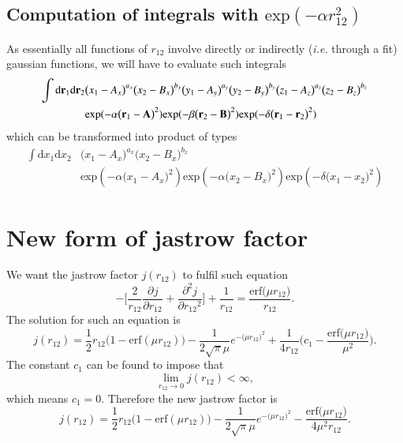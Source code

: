 \documentclass[aip,jcp,reprint,noshowkeys,superscriptaddress]{revtex4-1}
\newcommand{\deriv}[3]{\frac{\partial^{#3} #1}{\partial {#2}^{#3}}}
\newcommand{\br}[0]{{\bf {r}}}
\begin{document}
\subsection{Computation of integrals with $\text{exp}(-\alpha r_{12}^2)$}
As essentially all functions of $r_{12}$ involve directly or indirectly (\textit{i.e.} through a fit) gaussian functions, we will have to evaluate such integrals
\begin{equation}
 \begin{aligned}
  \int \text{d}\br{}_1  \text{d}\br{}_2& \big( x_1 - A_x \big)^{a_x}  \big( x_2 - B_x \big)^{b_x} 
                                         \big( y_1 - A_y \big)^{a_y}  \big( y_2 - B_y \big)^{b_y} 
                                         \big( z_1 - A_z \big)^{a_z}  \big( z_2 - B_z \big)^{b_z} \\
                                       & \text{exp}(-\alpha \big(\br{}_1 - {\bf A} \big)^2)
                                         \text{exp}(-\beta  \big(\br{}_2 - {\bf B} \big)^2)
                                         \text{exp}(-\delta \big(\br{}_1 - \br{}_2 \big)^2)
 \end{aligned}
\end{equation}
which can be transformed into product of types 
\begin{equation}
 \begin{aligned}
  \int \text{d}x_1 \text{d}x_2 & \big( x_1 - A_x \big)^{a_x} \big( x_2 - B_x \big)^{b_x} \\ 
  & \text{exp}(-\alpha \big(x_1 - A_x \big)^2) \text{exp}(-\alpha \big(x_2 - B_x \big)^2) \text{exp}(-\delta \big(x_1 - x_2 \big)^2)
 \end{aligned}
\end{equation}

\section{New form of jastrow factor}
We want the jastrow factor $j(r_{12})$ to fulfil such equation
\begin{equation}
 - \bigg[ \frac{2}{r_{12}} \deriv{j}{r_{12}}{}  + \deriv{j}{r_{12}}{2} \bigg] + \frac{1}{r_{12}} = \frac{\text{erf}\big( \mu r_{12} \big)}{r_{12}}.
\end{equation}
The solution for such an equation is 
\begin{equation}
 j(r_{12}) = \frac{1}{2}r_{12}\bigg( 1 - \text{erf}(\mu r_{12}) \bigg) - \frac{1}{2\sqrt{\pi} \mu} e^{-\big( \mu r_{12}\big)^2} + \frac{1}{4 r_{12}} \bigg(c_1 - \frac{\text{erf}\big(\mu r_{12} \big)}{\mu^2} \bigg).
\end{equation}
The constant $c_1$ can be found to impose that 
\begin{equation}
 \lim_{r_{12} \rightarrow 0 } j(r_{12}) < \infty,
\end{equation}
which means $c_1 = 0$. Therefore the new jastrow factor is 
\begin{equation}
 j(r_{12}) = \frac{1}{2}r_{12}\bigg( 1 - \text{erf}(\mu r_{12}) \bigg) - \frac{1}{2\sqrt{\pi} \mu} e^{-\big( \mu r_{12}\big)^2}  - \frac{\text{erf}\big(\mu r_{12} \big)}{4 \mu^2 r_{12}}.
\end{equation}
\end{document}

